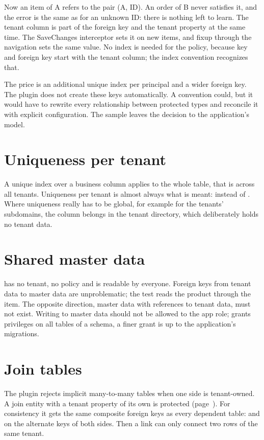 Now an item of A refers to the pair (A, ID). An order of B never satisfies it, and the error is
the same as for an unknown ID: there is nothing left to learn. The tenant column is part of the
foreign key and the tenant property at the same time. The SaveChanges interceptor sets it on new
items, and fixup through the navigation sets the same value. No index is needed for the policy,
because key and foreign key start with the tenant column; the index convention recognizes that.

The price is an additional unique index per principal and a wider foreign key. The plugin does
not create these keys automatically. A convention could, but it would have to rewrite every
relationship between protected types and reconcile it with explicit configuration. The sample
leaves the decision to the application's model.

\section{Uniqueness per tenant}

A unique index over a business column applies to the whole table, that is across all tenants.
Uniqueness per tenant is almost always what is meant:  instead of
. Where uniqueness really has to be global, for example for the tenants'
subdomains, the column belongs in the tenant directory, which deliberately holds no tenant data.

\section{Shared master data}

 has no tenant, no policy and is readable by everyone. Foreign keys from tenant data
to master data are unproblematic; the test reads the product through the item. The opposite
direction, master data with references to tenant data, must not exist. Writing to master data
should not be allowed to the app role; 
grants privileges on all tables of a schema, a finer grant is up to the application's
migrations.

\section{Join tables}

The plugin rejects implicit many-to-many tables when one side is tenant-owned. A join entity with
a tenant property of its own is protected (page~\pageref{sec:supported-table-mappings}). For
consistency it gets the same composite foreign keys as every dependent table:
 and  on the alternate keys of both sides.
Then a link can only connect two rows of the same tenant.

